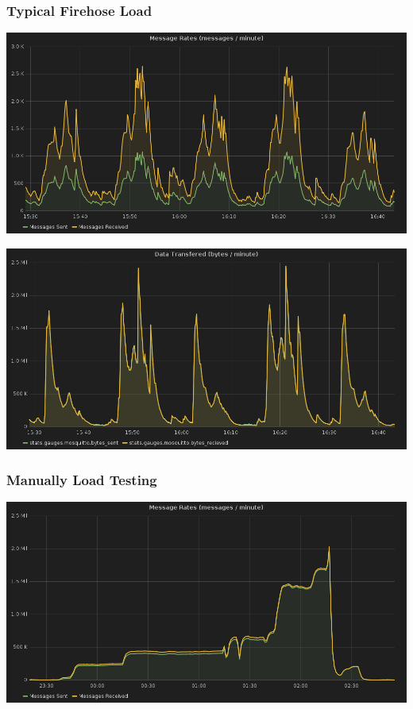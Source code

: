 \documentclass[aspectratio=169,11pt,hyperref={colorlinks=true}]{beamer}
\begin{document}
\begin{frame}
    \frametitle{Typical Firehose Load}
    \centering
    \includegraphics[width=.9\textwidth]{typical_message_rates.png}
\end{frame}

\begin{frame}
    \centering
    \includegraphics[width=.9\textwidth]{typical_data_rates.png}
\end{frame}

\begin{frame}
    \frametitle{Manually Load Testing}
    \centering
    \includegraphics[width=.9\textwidth]{manual-load-test.png}
\end{frame}
\end{document}
